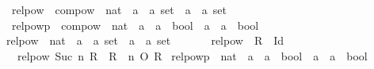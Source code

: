 \begin{isabellebody}
\begin{isamarkuptext}
\end{isamarkuptext}\isamarkuptrue%
\isamarkupfalse%
\isanewline
\ \ relpow\ {\isasymequiv}\ {\isachardoublequoteopen}compow\ {\isacharcolon}{\kern0pt}{\isacharcolon}{\kern0pt}\ nat\ {\isasymRightarrow}\ {\isacharparenleft}{\kern0pt}{\isacharprime}{\kern0pt}a\ {\isasymtimes}\ {\isacharprime}{\kern0pt}a{\isacharparenright}{\kern0pt}\ set\ {\isasymRightarrow}\ {\isacharparenleft}{\kern0pt}{\isacharprime}{\kern0pt}a\ {\isasymtimes}\ {\isacharprime}{\kern0pt}a{\isacharparenright}{\kern0pt}\ set{\isachardoublequoteclose}\isanewline
\ \ relpowp\ {\isasymequiv}\ {\isachardoublequoteopen}compow\ {\isacharcolon}{\kern0pt}{\isacharcolon}{\kern0pt}\ nat\ {\isasymRightarrow}\ {\isacharparenleft}{\kern0pt}{\isacharprime}{\kern0pt}a\ {\isasymRightarrow}\ {\isacharprime}{\kern0pt}a\ {\isasymRightarrow}\ bool{\isacharparenright}{\kern0pt}\ {\isasymRightarrow}\ {\isacharparenleft}{\kern0pt}{\isacharprime}{\kern0pt}a\ {\isasymRightarrow}\ {\isacharprime}{\kern0pt}a\ {\isasymRightarrow}\ bool{\isacharparenright}{\kern0pt}{\isachardoublequoteclose}\isanewline
{}\isanewline
\isanewline
{}\isamarkupfalse%
\ relpow\ {\isacharcolon}{\kern0pt}{\isacharcolon}{\kern0pt}\ {\isachardoublequoteopen}nat\ {\isasymRightarrow}\ {\isacharparenleft}{\kern0pt}{\isacharprime}{\kern0pt}a\ {\isasymtimes}\ {\isacharprime}{\kern0pt}a{\isacharparenright}{\kern0pt}\ set\ {\isasymRightarrow}\ {\isacharparenleft}{\kern0pt}{\isacharprime}{\kern0pt}a\ {\isasymtimes}\ {\isacharprime}{\kern0pt}a{\isacharparenright}{\kern0pt}\ set{\isachardoublequoteclose}\isanewline
\ \ \isanewline
\ \ \ \ {\isachardoublequoteopen}relpow\ {}\ R\ {\isacharequal}{\kern0pt}\ Id{\isachardoublequoteclose}\isanewline
\ \ {\isacharbar}{\kern0pt}\ {\isachardoublequoteopen}relpow\ {\isacharparenleft}{\kern0pt}Suc\ n{\isacharparenright}{\kern0pt}\ R\ {\isacharequal}{\kern0pt}\ {\isacharparenleft}{\kern0pt}R\ {\isacharcircum}{\kern0pt}{\isacharcircum}{\kern0pt}\ n{\isacharparenright}{\kern0pt}\ O\ R{\isachardoublequoteclose}\isanewline
\isanewline
{}\isamarkupfalse%
\ relpowp\ {\isacharcolon}{\kern0pt}{\isacharcolon}{\kern0pt}\ {\isachardoublequoteopen}nat\ {\isasymRightarrow}\ {\isacharparenleft}{\kern0pt}{\isacharprime}{\kern0pt}a\ {\isasymRightarrow}\ {\isacharprime}{\kern0pt}a\ {\isasymRightarrow}\ bool{\isacharparenright}{\kern0pt}\ {\isasymRightarrow}\ {\isacharparenleft}{\kern0pt}{\isacharprime}{\kern0pt}a\ {\isasymRightarrow}\ {\isacharprime}{\kern0pt}a\ {\isasymRightarrow}\ bool{\isacharparenright}{\kern0pt}{\isachardoublequoteclose}\isanewline

\end{isabellebody}
